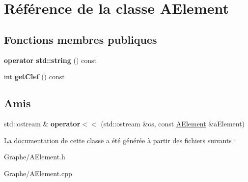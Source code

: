 \hypertarget{class_a_element}{}\section{Référence de la classe A\+Element}
\label{class_a_element}
\subsection*{Fonctions membres publiques}
\begin{DoxyCompactItemize}
\item 
\mbox{\label{class_a_element_ab127c3e12cb3ce5f418d94e4076b7977}} 
{\bfseries operator std\+::string} () const
\item 
\mbox{\label{class_a_element_abcd3c435b0660faffbcd0178c55d8480}} 
int {\bfseries get\+Clef} () const
\end{DoxyCompactItemize}
\subsection*{Amis}
\begin{DoxyCompactItemize}
\item 
\mbox{\label{class_a_element_aeda3502022d5d2a1aee7ab15a6f74f9c}} 
std\+::ostream \& {\bfseries operator$<$$<$} (std\+::ostream \&os, const \mbox{\hyperlink{class_a_element}{A\+Element}} \&a\+Element)
\end{DoxyCompactItemize}


La documentation de cette classe a été générée à partir des fichiers suivants \+:\begin{DoxyCompactItemize}
\item 
Graphe/A\+Element.\+h\item 
Graphe/A\+Element.\+cpp\end{DoxyCompactItemize}
